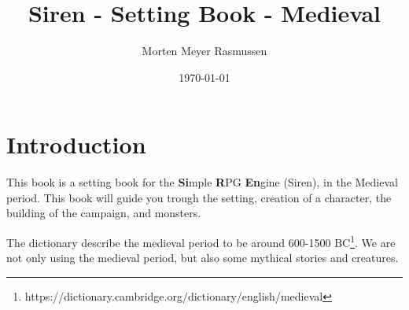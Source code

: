 \documentclass[12pt, a4paper]{book}
\title{Siren - Setting Book - Medieval}
\author{Morten Meyer Rasmussen}
\date{\today}
\begin{document}
\maketitle

\section*{Introduction}
This book is a setting book for the \textbf{Si}mple \textbf{R}PG \textbf{En}gine (Siren), in the Medieval period.
This book will guide you trough the setting, creation of a character, the building of the campaign, and monsters.

The dictionary describe the medieval period to be around 600-1500 BC\footnote{https://dictionary.cambridge.org/dictionary/english/medieval}.
We are not only using the medieval period, but also some mythical stories and creatures.

\tableofcontents









\end{document}

